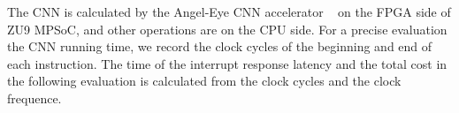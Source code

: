 The CNN is calculated by the Angel-Eye CNN accelerator ~\cite{guo2017angel} on the FPGA side of ZU9 MPSoC, and other operations are on the CPU side.
For a precise evaluation the CNN running time, we record the clock cycles of the beginning and end of each instruction. The time of the interrupt response latency and the total cost in the following evaluation is calculated from the clock cycles and the clock frequence.


  



